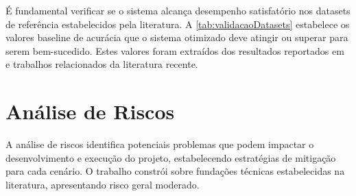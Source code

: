 É fundamental verificar se o sistema alcança desempenho satisfatório nos datasets de referência estabelecidos pela literatura. A \autoref{tab:validacaoDatasets} estabelece os valores baseline de acurácia que o sistema otimizado deve atingir ou superar para serem bem-sucedido. Estes valores foram extraídos dos resultados reportados em \cite{Souza2023} e trabalhos relacionados da literatura recente.


\begin{quadro}[H]
    \centering
    \caption{Validação de desempenho nos datasets de referência}
    \label{tab:validacaoDatasets}
\end{quadro}

\section{Análise de Riscos} 
\label{sec:analiseRiscos}

A análise de riscos identifica potenciais problemas que podem impactar o desenvolvimento e execução do projeto, estabelecendo estratégias de mitigação para cada cenário. O trabalho constrói sobre fundações técnicas estabelecidas na literatura, apresentando risco geral moderado.

